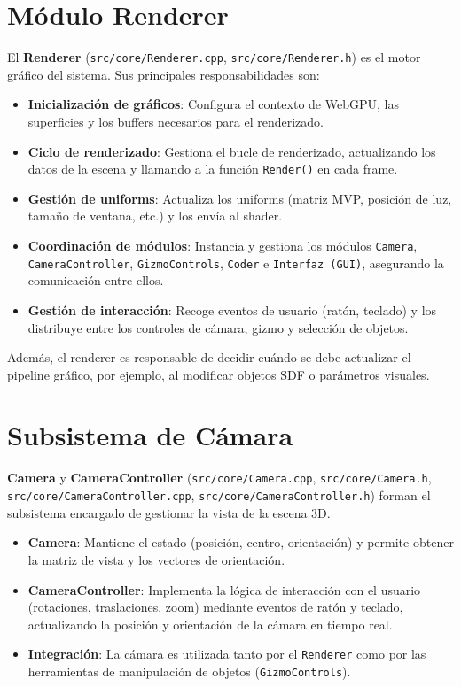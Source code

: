 \section{Módulo Renderer}

El \textbf{Renderer} (\texttt{src/core/Renderer.cpp},
\texttt{src/core/Renderer.h}) es el motor gráfico del sistema. Sus principales
responsabilidades son:
\begin{itemize}
    \item \textbf{Inicialización de gráficos}: Configura el contexto de WebGPU, las superficies y los buffers necesarios para el renderizado.
    \item \textbf{Ciclo de renderizado}: Gestiona el bucle de renderizado, actualizando los datos de la escena y llamando a la función \texttt{Render()} en cada frame.
    \item \textbf{Gestión de uniforms}: Actualiza los uniforms (matriz MVP, posición de luz, tamaño de ventana, etc.) y los envía al shader.
    \item \textbf{Coordinación de módulos}: Instancia y gestiona los módulos \texttt{Camera}, \texttt{CameraController}, \texttt{GizmoControls}, \texttt{Coder} e \texttt{Interfaz (GUI)}, asegurando la comunicación entre ellos.
    \item \textbf{Gestión de interacción}: Recoge eventos de usuario (ratón, teclado) y los distribuye entre los controles de cámara, gizmo y selección de objetos.
\end{itemize}
Además, el renderer es responsable de decidir cuándo se debe actualizar el
pipeline gráfico, por ejemplo, al modificar objetos SDF o parámetros visuales.

\section{Subsistema de Cámara}

\textbf{Camera} y \textbf{CameraController} (\texttt{src/core/Camera.cpp}, \texttt{src/core/Camera.h}, \texttt{src/core/CameraController.cpp}, \texttt{src/core/CameraController.h}) forman el subsistema encargado de gestionar la vista de la escena 3D.
\begin{itemize}
    \item \textbf{Camera}: Mantiene el estado (posición, centro, orientación) y permite obtener la matriz de vista y los vectores de orientación.
    \item \textbf{CameraController}: Implementa la lógica de interacción con el usuario (rotaciones, traslaciones, zoom) mediante eventos de ratón y teclado, actualizando la posición y orientación de la cámara en tiempo real.
    \item \textbf{Integración}: La cámara es utilizada tanto por el \texttt{Renderer} como por las herramientas de manipulación de objetos (\texttt{GizmoControls}).
\end{itemize}

